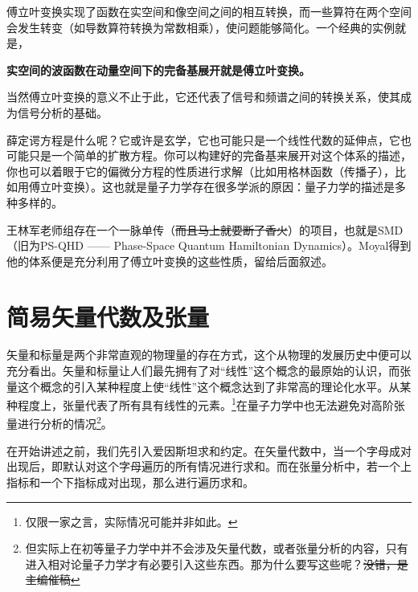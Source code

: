\documentclass[12pt,a4paper,openany,twoside]{book}
\numberwithin{equation}{section}
\begin{document}
    傅立叶变换实现了函数在实空间和像空间之间的相互转换，而一些算符在两个空间会发生转变（如导数算符转换为常数相乘），使问题能够简化。一个经典的实例就是，
    \begin{center}
      \textbf{实空间的波函数在动量空间下的完备基展开就是傅立叶变换。}
    \end{center}
    当然傅立叶变换的意义不止于此，它还代表了信号和频谱之间的转换关系，使其成为信号分析的基础。

    薛定谔方程是什么呢？它或许是玄学，它也可能只是一个线性代数的延伸点，它也可能只是一个简单的扩散方程。你可以构建好的完备基来展开对这个体系的描述，你也可以着眼于它的偏微分方程的性质进行求解（比如用格林函数（传播子），比如用傅立叶变换）。这也就是量子力学存在很多学派的原因：量子力学的描述是多种多样的。

    王林军老师组存在一个一脉单传（\sout{而且马上就要断了香火}）的项目，也就是SMD（旧为PS-QHD —— Phase-Space Quantum Hamiltonian Dynamics）。Moyal得到他的体系便是充分利用了傅立叶变换的这些性质，留给后面叙述。

      \section{简易矢量代数及张量}
    矢量和标量是两个非常直观的物理量的存在方式，这个从物理的发展历史中便可以充分看出。矢量和标量让人们最先拥有了对“线性”这个概念的最原始的认识，而张量这个概念的引入某种程度上使“线性”这个概念达到了非常高的理论化水平。从某种程度上，张量代表了所有具有线性的元素。\footnote{仅限一家之言，实际情况可能并非如此。}在量子力学中也无法避免对高阶张量进行分析的情况\footnote{但实际上在初等量子力学中并不会涉及矢量代数，或者张量分析的内容，只有进入相对论量子力学才有必要引入这些东西。那为什么要写这些呢？\sout{没错，是主编催稿}}。

    在开始讲述之前，我们先引入爱因斯坦求和约定。在矢量代数中，当一个字母成对出现后，即默认对这个字母遍历的所有情况进行求和。而在张量分析中，若一个上指标和一个下指标成对出现，那么进行遍历求和。
\end{document}
